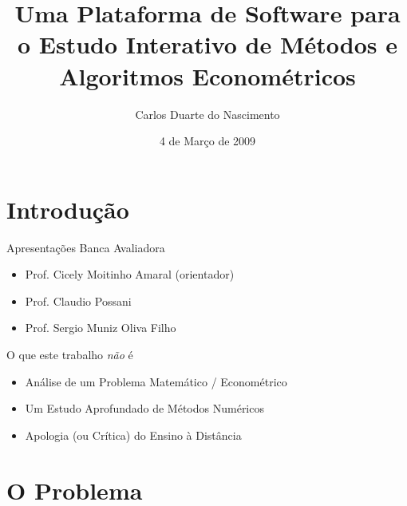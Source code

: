 \documentclass{beamer}
\title[Plataforma para Estudo Interativo de Métodos Econométricos] %
{Uma Plataforma de Software para o Estudo Interativo de Métodos e Algoritmos Econométricos}
\author %
{Carlos Duarte do Nascimento}
\institute[Universidade de São Paulo] %
{
  Instituto de Matemática e Estatística\\
  Universidade de São Paulo
}
\date %
{4 de Março de 2009}
\begin{document}
\begin{frame}
  \titlepage
\end{frame}





\section{Introdução}
\begin{frame}{Apresentações}
	Banca Avaliadora
	\begin{itemize}
			\item{Prof. Cicely Moitinho Amaral (orientador)}
			\item{Prof. Claudio Possani}
			\item{Prof. Sergio Muniz Oliva Filho}
	\end{itemize}
\end{frame}

\begin{frame}{O que este trabalho \textit{não} é}
	\begin{itemize}
		\item Análise de um Problema Matemático / Econométrico
		\item Um Estudo Aprofundado de Métodos Numéricos
		\item Apologia (ou Crítica) do Ensino à Distância
	\end{itemize}
\end{frame}

\section{O Problema}
\end{document}

